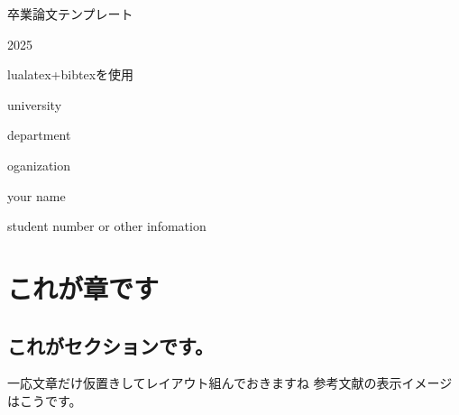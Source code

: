 \documentclass{ltjsreport}
\begin{document}
\begin{titlepage}
    \begin{center}


        \vspace*{140truept}

        {\Huge 卒業論文テンプレート}

        \vspace{140truept}

        {\Large 2025}

        \vspace{30truept}

        {\Large lualatex+bibtexを使用}

        \vspace{10truept}

        {\Large university}

        \vspace{10truept}

        {\Large department}

        \vspace{10truept}

        {\Large oganization}

        \vspace{70truept}

        {\Large your name}

        \vspace{30truept}

        {\Large student number or other infomation}

    \end{center}
\end{titlepage}

\setcounter{tocdepth}{4}
\tableofcontents
\clearpage



\chapter{これが章です}
\label{chap:章}
    \section{これがセクションです。}
    \label{sec:セクション}
    一応文章だけ仮置きしてレイアウト組んでおきますね
    参考文献の表示イメージはこうです。\cite{yoshida1985}\cite{hoshino2003,okada2005,okada2023}
\end{document}
